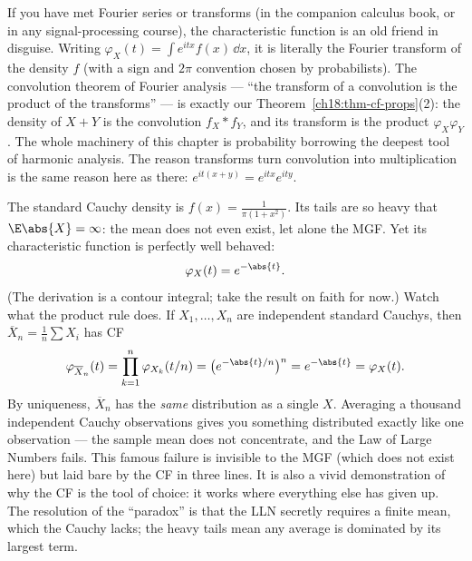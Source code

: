 \begin{connectionbox}
If you have met Fourier series or transforms (in the companion calculus book, or
in any signal-processing course), the characteristic function is an old friend
in disguise. Writing $\varphi_X(t)=\int e^{itx}f(x)\,\dd x$, it is literally the
Fourier transform of the density $f$ (with a sign and $2\pi$ convention chosen
by probabilists). The convolution theorem of Fourier analysis --- ``the
transform of a convolution is the product of the transforms'' --- is exactly our
Theorem~\ref{ch18:thm-cf-props}(2): the density of $X+Y$ is the convolution
$f_X * f_Y$, and its transform is the product $\varphi_X\varphi_Y$. The whole
machinery of this chapter is probability borrowing the deepest tool of
harmonic analysis. The reason transforms turn convolution into multiplication
is the same reason here as there: $e^{it(x+y)}=e^{itx}e^{ity}$.
\end{connectionbox}

\begin{paradoxbox}
\label{ch18:ex-cauchy}
The standard Cauchy density is $f(x)=\frac{1}{\pi(1+x^2)}$. Its tails are so
heavy that $\E\abs{X}=\infty$: the mean does not even exist, let alone the MGF.
Yet its characteristic function is perfectly well behaved:
\[
  \varphi_X(t) = e^{-\abs{t}} .
\]
(The derivation is a contour integral; take the result on faith for now.) Watch
what the product rule does. If $X_1,\dots,X_n$ are independent standard Cauchys,
then $\overline{X}_n=\frac1n\sum X_i$ has CF
\[
  \varphi_{\overline X_n}(t)
   = \prod_{k=1}^n \varphi_{X_k}(t/n)
   = \big(e^{-\abs{t}/n}\big)^n
   = e^{-\abs{t}} = \varphi_X(t).
\]
By uniqueness, $\overline{X}_n$ has the \emph{same} distribution as a single
$X$. Averaging a thousand independent Cauchy observations gives you something
distributed exactly like one observation --- the sample mean does not
concentrate, and the Law of Large Numbers fails. This famous failure is
invisible to the MGF (which does not exist here) but laid bare by the CF in
three lines. It is also a vivid demonstration of why the CF is the tool of
choice: it works where everything else has given up. The resolution of the
``paradox'' is that the LLN secretly requires a finite mean, which the Cauchy
lacks; the heavy tails mean any average is dominated by its largest term.
\end{paradoxbox}

